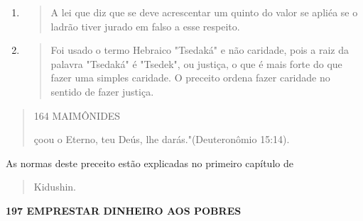 \begin{enumerate}
\def\labelenumi{\arabic{enumi}.}
\setcounter{enumi}{198}
\item
  \begin{quote}
  A lei que diz que se deve acrescentar um quinto do valor se apliéa se
  o ladrão tiver jurado em falso a esse respeito.
  \end{quote}
\item
  \begin{quote}
  Foi usado o termo Hebraico "Tsedaká" e não caridade, pois a raiz da
  palavra "Tsedaká" é "Tsedek", ou justiça, o que é mais forte do que
  fazer uma simples caridade. O preceito ordena fazer caridade no
  sentido de fazer justiça.
  \end{quote}
\end{enumerate}

\begin{quote}
164 MAIMÔNIDES

çoou o Eterno, teu Deús, lhe darás."(Deuteronômio 15:14).
\end{quote}

As normas deste preceito estão explicadas no primeiro capítulo de

\begin{quote}
Kidushin.
\end{quote}

\textbf{197 EMPRESTAR DINHEIRO AOS POBRES}

